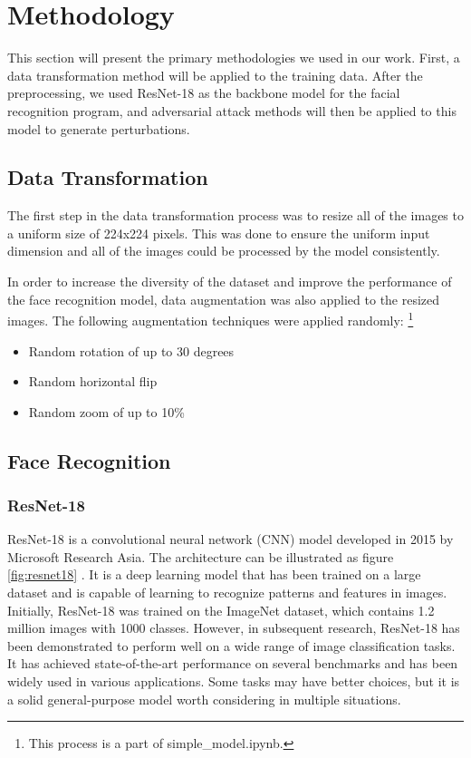\section{Methodology}

This section will present the primary methodologies we used in our work. First, a data transformation method will be applied to the training data. After the preprocessing, we used ResNet-18 as the backbone model for the facial recognition program, and adversarial attack methods will then be applied to this model to generate perturbations. 

\subsection{Data Transformation}

The first step in the data transformation process was to resize all of the images to a uniform size of 224x224 pixels. This was done to ensure the uniform input dimension and all of the images could be processed by the model consistently. 

In order to increase the diversity of the dataset and improve the performance of the face recognition model, data augmentation was also applied to the resized images. The following augmentation techniques were applied randomly:
\footnote{This process is a part of simple\_model.ipynb.}

\begin{itemize}
    \item Random rotation of up to 30 degrees
    \item Random horizontal flip
    \item Random zoom of up to 10\%
\end{itemize}


\subsection{Face Recognition}

\subsubsection{ResNet-18}


ResNet-18 is a convolutional neural network (CNN) model developed in 2015 by Microsoft Research Asia. The architecture can be illustrated as figure \ref{fig:resnet18} \cite{ResNet-18}. It is a deep learning model that has been trained on a large dataset and is capable of learning to recognize patterns and features in images. Initially, ResNet-18 was trained on the ImageNet dataset, which contains 1.2 million images with 1000 classes. However, in subsequent research, ResNet-18 has been demonstrated to perform well on a wide range of image classification tasks. It has achieved state-of-the-art performance on several benchmarks and has been widely used in various applications. Some tasks may have better choices, but it is a solid general-purpose model worth considering in multiple situations.\\

